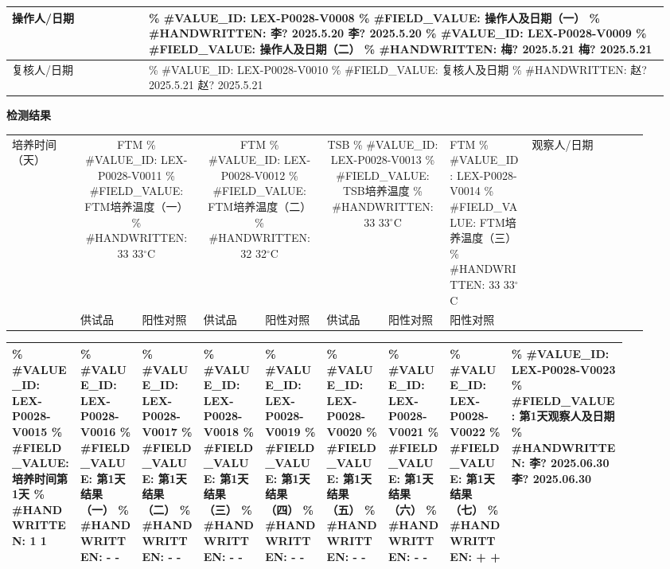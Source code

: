 \documentclass[UTF8,10pt,a4paper,fontset=fandol]{ctexart}
\newcommand{\fieldvalue}[1]{#1}
\newcommand{\handwritten}[1]{#1}
\begin{document}
\begin{tabular}{|p{0.20\linewidth}|p{0.76\linewidth}|}
\hline
操作人/日期 &
\% #VALUE_ID: LEX-P0028-V0008
\% #FIELD_VALUE: 操作人及日期（一）
\% #HANDWRITTEN: 李? 2025.5.20
\fieldvalue{\handwritten{李? 2025.5.20}}
\quad
\% #VALUE_ID: LEX-P0028-V0009
\% #FIELD_VALUE: 操作人及日期（二）
\% #HANDWRITTEN: 梅? 2025.5.21
\fieldvalue{\handwritten{梅? 2025.5.21}}\\
\hline
复核人/日期 &
\% #VALUE_ID: LEX-P0028-V0010
\% #FIELD_VALUE: 复核人及日期
\% #HANDWRITTEN: 赵? 2025.5.21
\fieldvalue{\handwritten{赵? 2025.5.21}}\\
\hline
\end{tabular}

\begin{center}
\textbf{检测结果}
\end{center}

\small
\begin{tabular}{|p{0.10\linewidth}|p{0.09\linewidth}|p{0.09\linewidth}|p{0.09\linewidth}|p{0.09\linewidth}|p{0.09\linewidth}|p{0.09\linewidth}|p{0.12\linewidth}|p{0.17\linewidth}|}
\hline
培养时间（天） &
\multicolumn{2}{c|}{FTM
\% #VALUE_ID: LEX-P0028-V0011
\% #FIELD_VALUE: FTM培养温度（一）
\% #HANDWRITTEN: 33
\fieldvalue{\handwritten{33}}${}^{\circ}$C} &
\multicolumn{2}{c|}{FTM
\% #VALUE_ID: LEX-P0028-V0012
\% #FIELD_VALUE: FTM培养温度（二）
\% #HANDWRITTEN: 32
\fieldvalue{\handwritten{32}}${}^{\circ}$C} &
\multicolumn{2}{c|}{TSB
\% #VALUE_ID: LEX-P0028-V0013
\% #FIELD_VALUE: TSB培养温度
\% #HANDWRITTEN: 33
\fieldvalue{\handwritten{33}}${}^{\circ}$C} &
FTM
\% #VALUE_ID: LEX-P0028-V0014
\% #FIELD_VALUE: FTM培养温度（三）
\% #HANDWRITTEN: 33
\fieldvalue{\handwritten{33}}${}^{\circ}$C} &
观察人/日期\\
\cline{2-8}
& 供试品 & 阳性对照 & 供试品 & 阳性对照 & 供试品 & 阳性对照 & 阳性对照 &\\
\hline
\end{tabular}

\begin{tabular}{|p{0.10\linewidth}|*{7}{p{0.09\linewidth}|}p{0.17\linewidth}|}
\hline
\% #VALUE_ID: LEX-P0028-V0015
\% #FIELD_VALUE: 培养时间第1天
\% #HANDWRITTEN: 1
\fieldvalue{\handwritten{1}} &
\% #VALUE_ID: LEX-P0028-V0016
\% #FIELD_VALUE: 第1天结果（一）
\% #HANDWRITTEN: -
\fieldvalue{\handwritten{-}} &
\% #VALUE_ID: LEX-P0028-V0017
\% #FIELD_VALUE: 第1天结果（二）
\% #HANDWRITTEN: -
\fieldvalue{\handwritten{-}} &
\% #VALUE_ID: LEX-P0028-V0018
\% #FIELD_VALUE: 第1天结果（三）
\% #HANDWRITTEN: -
\fieldvalue{\handwritten{-}} &
\% #VALUE_ID: LEX-P0028-V0019
\% #FIELD_VALUE: 第1天结果（四）
\% #HANDWRITTEN: -
\fieldvalue{\handwritten{-}} &
\% #VALUE_ID: LEX-P0028-V0020
\% #FIELD_VALUE: 第1天结果（五）
\% #HANDWRITTEN: -
\fieldvalue{\handwritten{-}} &
\% #VALUE_ID: LEX-P0028-V0021
\% #FIELD_VALUE: 第1天结果（六）
\% #HANDWRITTEN: -
\fieldvalue{\handwritten{-}} &
\% #VALUE_ID: LEX-P0028-V0022
\% #FIELD_VALUE: 第1天结果（七）
\% #HANDWRITTEN: +
\fieldvalue{\handwritten{+}} &
\% #VALUE_ID: LEX-P0028-V0023
\% #FIELD_VALUE: 第1天观察人及日期
\% #HANDWRITTEN: 李? 2025.06.30
\fieldvalue{\handwritten{李? 2025.06.30}}\\
\hline
\end{tabular}
\end{document}
